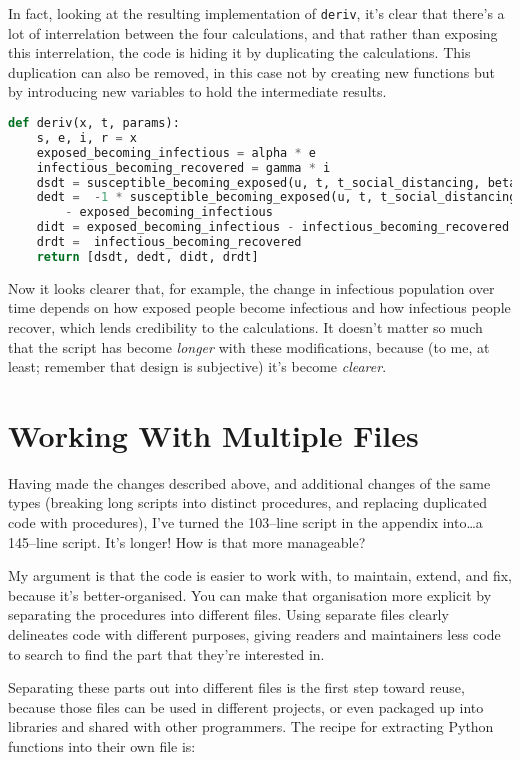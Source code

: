 \documentclass[a4paper]{article}
\begin{document}
In fact, looking at the resulting implementation of \texttt{deriv}, it's clear that there's a lot of interrelation between the four calculations, and that rather than exposing this interrelation, the code is hiding it by duplicating the calculations.
This duplication can also be removed, in this case not by creating new functions but by introducing new variables to hold the intermediate results.

\begin{lstlisting}[language=Python]
def deriv(x, t, params):
    s, e, i, r = x
    exposed_becoming_infectious = alpha * e
    infectious_becoming_recovered = gamma * i
    dsdt = susceptible_becoming_exposed(u, t, t_social_distancing, beta, s, i)
    dedt =  -1 * susceptible_becoming_exposed(u, t, t_social_distancing, beta, s, i)\
        - exposed_becoming_infectious
    didt = exposed_becoming_infectious - infectious_becoming_recovered
    drdt =  infectious_becoming_recovered
    return [dsdt, dedt, didt, drdt]
\end{lstlisting}

Now it looks clearer that, for example, the change in infectious population over time depends on how exposed people become infectious and how infectious people recover, which lends credibility to the calculations.
It doesn't matter so much that the script has become \emph{longer} with these modifications, because (to me, at least; remember that design is subjective) it's become \emph{clearer}.

\section{Working With Multiple Files}
Having made the changes described above, and additional changes of the same types (breaking long scripts into distinct procedures, and replacing duplicated code with procedures), I've turned the 103--line script in the appendix into\ldots a 145--line script.
It's longer! How is that more manageable?

My argument is that the code is easier to work with, to maintain, extend, and fix, because it's better-organised.
You can make that organisation more explicit by separating the procedures into different files.
Using separate files clearly delineates code with different purposes, giving readers and maintainers less code to search to find the part that they're interested in.

Separating these parts out into different files is the first step toward reuse, because those files can be used in different projects, or even packaged up into libraries and shared with other programmers.
The recipe for extracting Python functions into their own file is:
\end{document}
